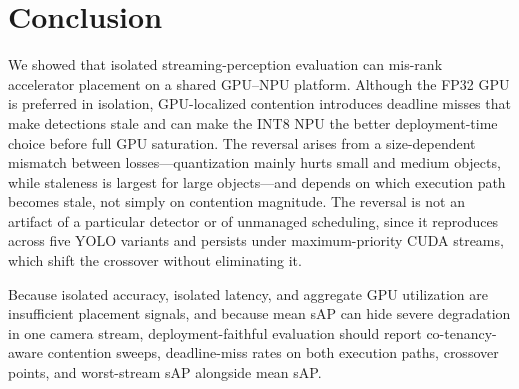 \documentclass[runningheads]{llncs}
\begin{document}
\section{Conclusion}
\label{sec:conclusion}

We showed that isolated streaming-perception evaluation can mis-rank accelerator placement on a shared GPU--NPU platform. Although the FP32 GPU is preferred in isolation, GPU-localized contention introduces deadline misses that make detections stale and can make the INT8 NPU the better deployment-time choice before full GPU saturation. The reversal arises from a size-dependent mismatch between losses---quantization mainly hurts small and medium objects, while staleness is largest for large objects---and depends on which execution path becomes stale, not simply on contention magnitude. The reversal is not an artifact of a particular detector or of unmanaged scheduling, since it reproduces across five YOLO variants and persists under maximum-priority CUDA streams, which shift the crossover without eliminating it.

Because isolated accuracy, isolated latency, and aggregate GPU utilization are insufficient placement signals, and because mean sAP can hide severe degradation in one camera stream, deployment-faithful evaluation should report co-tenancy-aware contention sweeps, deadline-miss rates on both execution paths, crossover points, and worst-stream sAP alongside mean sAP.
\end{document}
